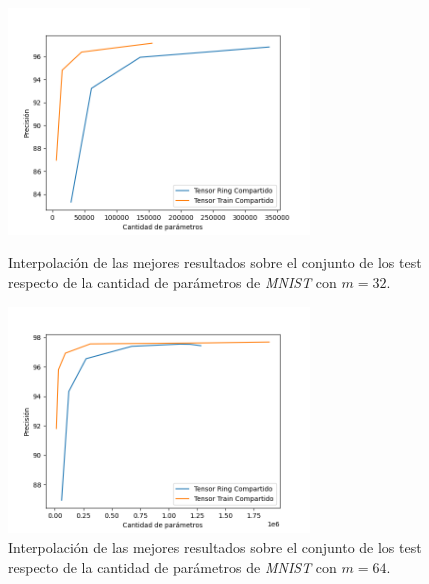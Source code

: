 \documentclass[spanish]{article}
\theoremstyle{definition}
\theoremstyle{remark}
\numberwithin{equation}{section}
\numberwithin{equation}{section} %
\begin{document}
\begin{figure}[H]
   \begin{minipage}{0.48\textwidth}
     \centering
     \captionsetup{justification=centering}
     \includegraphics[trim={0.8cm 0 1cm 1cm},clip,width=8cm]{img/MNIST/MNIST_interpolate_best_run_m=32.png}
     \caption{Interpolación de las mejores resultados  sobre el conjunto de los test respecto de la cantidad de parámetros de \textit{MNIST} con $m=32$.}\label{Fig:MNIST_interpolate_best_run_m=32}
   \end{minipage}\hfill
   \begin{minipage}{0.48\textwidth}
     \centering
          \captionsetup{justification=centering}

     \includegraphics[trim={0.8cm 0 1cm 1cm},clip,width=8cm]{img/MNIST/MNIST_interpolate_best_run_m=64.png}
     \caption{Interpolación de las mejores resultados  sobre el conjunto de los test respecto de la cantidad de parámetros de \textit{MNIST} con $m=64$.}\label{Fig:MNIST_interpolate_best_run_m=64}
   \end{minipage}
\end{figure}
\end{document}
